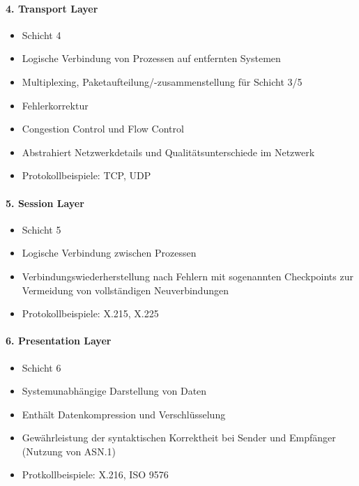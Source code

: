     \paragraph{4. Transport Layer}
        \begin{itemize}
        	\item Schicht 4
        	\item Logische Verbindung von Prozessen auf entfernten Systemen
        	\item Multiplexing, Paketaufteilung/-zusammenstellung für Schicht 3/5
        	\item Fehlerkorrektur
        	\item Congestion Control und Flow Control
        	\item Abstrahiert Netzwerkdetails und Qualitätsunterschiede im Netzwerk
        	\item Protokollbeispiele: TCP, UDP
        \end{itemize}
    
    \paragraph{5. Session Layer}
        \begin{itemize}
        	\item Schicht 5
        	\item Logische Verbindung zwischen Prozessen
        	\item Verbindungswiederherstellung nach Fehlern mit sogenannten Checkpoints zur Vermeidung von vollständigen Neuverbindungen
        	\item Protokollbeispiele: X.215, X.225
        \end{itemize}
    
    \paragraph{6. Presentation Layer}
        \begin{itemize}
        	\item Schicht 6
        	\item Systemunabhängige Darstellung von Daten
        	\item Enthält Datenkompression und Verschlüsselung
        	\item Gewährleistung der syntaktischen Korrektheit bei Sender und Empfänger (Nutzung von ASN.1)
        	\item Protkollbeispiele: X.216, ISO 9576
        \end{itemize}
    

